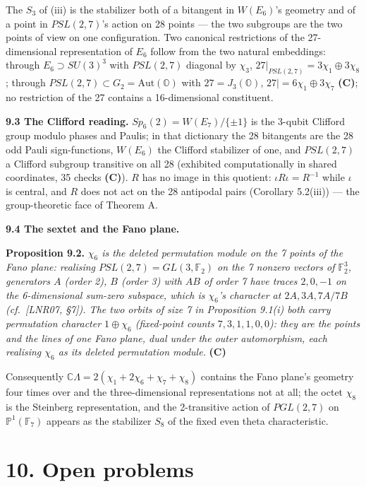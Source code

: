 \documentclass[
]{article}
\begin{document}
The \(S_3\) of (iii) is the stabilizer both of a bitangent in
\(W(E_6)\)'s geometry and of a point in \(PSL(2,7)\)'s action on 28
points --- the two subgroups are the two points of view on one
configuration. Two canonical restrictions of the 27-dimensional
representation of \(E_6\) follow from the two natural embeddings:
through \(E_6 \supset SU(3)^3\) with \(PSL(2,7)\) diagonal by
\(\chi_3\), \(27|_{PSL(2,7)} = 3\chi_1 \oplus 3\chi_8\); through
\(PSL(2,7) \subset G_2 = \mathrm{Aut}(\mathbb{O})\) with
\(27 = J_3(\mathbb{O})\), \(27| = 6\chi_1 \oplus 3\chi_7\) \textbf{(C)};
no restriction of the 27 contains a 16-dimensional constituent.

\textbf{9.3 The Clifford reading.} \(Sp_6(2) = W(E_7)/\{\pm1\}\) is the
3-qubit Clifford group modulo phases and Paulis; in that dictionary the
28 bitangents are the 28 odd Pauli sign-functions, \(W(E_6)\) the
Clifford stabilizer of one, and \(PSL(2,7)\) a Clifford subgroup
transitive on all 28 (exhibited computationally in shared coordinates,
35 checks \textbf{(C)}). \(R\) has no image in this quotient:
\(\iota R \iota = R^{-1}\) while \(\iota\) is central, and \(R\) does
not act on the 28 antipodal pairs (Corollary 5.2(iii)) --- the
group-theoretic face of Theorem A.

\textbf{9.4 The sextet and the Fano plane.}

\textbf{Proposition 9.2.} \emph{\(\chi_6\) is the deleted permutation
module on the 7 points of the Fano plane: realising
\(PSL(2,7) = GL(3,\mathbb{F}_2)\) on the 7 nonzero vectors of
\(\mathbb{F}_2^3\), generators \(A\) (order 2), \(B\) (order 3) with
\(AB\) of order 7 have traces \(2, 0, -1\) on the 6-dimensional sum-zero
subspace, which is \(\chi_6\)'s character at \(2A, 3A, 7A/7B\)
(cf.~{[}LNR07, §7{]}). The two orbits of size 7 in Proposition 9.1(i)
both carry permutation character \(1 \oplus \chi_6\) (fixed-point counts
\(7, 3, 1, 1, 0, 0\)): they are the points and the lines of one Fano
plane, dual under the outer automorphism, each realising \(\chi_6\) as
its deleted permutation module.} \textbf{(C)}

Consequently
\(\mathbb{C}\Lambda = 2(\chi_1 + 2\chi_6 + \chi_7 + \chi_8)\) contains
the Fano plane's geometry four times over and the three-dimensional
representations not at all; the octet \(\chi_8\) is the Steinberg
representation, and the 2-transitive action of \(PGL(2,7)\) on
\(\mathbb{P}^1(\mathbb{F}_7)\) appears as the stabilizer \(S_8\) of the
fixed even theta characteristic.

\section{10. Open problems}\label{open-problems}
\end{document}
